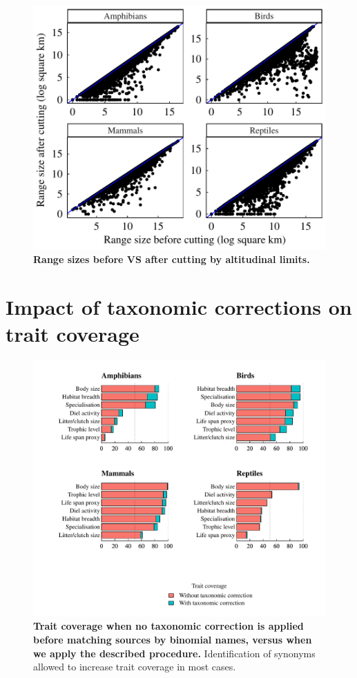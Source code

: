 \begin{figure}[h!]
\centering
\includegraphics[scale=0.7]{Supporting/Chapter2/Figures/Rangesizes/RangeSizes_before_aftercuts}
\caption[]{\textbf{Range sizes before VS after cutting by altitudinal limits.}}
\label{SI2_cutalt_ranges}
\end{figure}

\pagebreak

\section{Impact of taxonomic corrections on trait coverage}

\begin{figure}[h!]
\centering
\includegraphics[scale=0.7]{Supporting/Chapter2/Figures/Coverage/DeltaCoverage}
\caption[]{\textbf{Trait coverage when no taxonomic correction is applied before matching sources by binomial names, versus when we apply the described procedure.} Identification of synonyms allowed to increase trait coverage in most cases.}
\label{SI_2_deltaCov_taxcor}
\end{figure}

